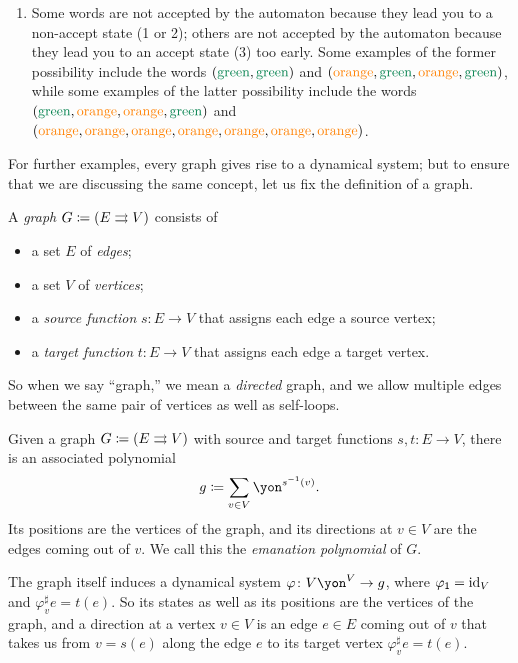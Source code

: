 \documentclass[Book-Poly]{subfiles}
\begin{document}
\begin{exercise}
\begin{solution}
\begin{enumerate}
    \item Some words are not accepted by the automaton because they lead you to a non-accept state (1 or 2); others are not accepted by the automaton because they lead you to an accept state (3) too early.
    Some examples of the former possibility include the words $({\color{dgreen}\text{green}},{\color{dgreen}\text{green}})$ and $({\color{orange}\text{orange}},{\color{dgreen}\text{green}},{\color{orange}\text{orange}},{\color{dgreen}\text{green}})$, while some examples of the latter possibility include the words $({\color{dgreen}\text{green}},{\color{orange}\text{orange}},{\color{orange}\text{orange}},{\color{dgreen}\text{green}})$ and $({\color{orange}\text{orange}},{\color{orange}\text{orange}},{\color{orange}\text{orange}},{\color{orange}\text{orange}},{\color{orange}\text{orange}},{\color{orange}\text{orange}},{\color{orange}\text{orange}})$.
\end{enumerate}
\end{solution}
\end{exercise}

For further examples, every graph gives rise to a dynamical system; but to ensure that we are discussing the same concept, let us fix the definition of a graph.

\begin{definition}[Graph] \label{def.graph}
A \emph{graph} $G \coloneqq (E \rightrightarrows V)$ consists of
\begin{itemize}
  \item a set $E$ of \emph{edges};
  \item a set $V$ of \emph{vertices};
  \item a \emph{source function} $s\colon E\to V$ that assigns each edge a source vertex;
  \item a \emph{target function} $t\colon E\to V$ that assigns each edge a target vertex.
\end{itemize}
\end{definition}

So when we say ``graph,'' we mean a \emph{directed} graph, and we allow multiple edges between the same pair of vertices as well as self-loops.

\begin{example} \label{ex.graph_dyn}
Given a graph $G\coloneqq(E\rightrightarrows V)$ with source and target functions $s,t\colon E\to V$, there is an associated polynomial
\[
    g\coloneqq\sum_{v \in V} \yon^{s\inv(v)}.
\]
Its positions are the vertices of the graph, and its directions at $v\in V$ are the edges coming out of $v$.
We call this the \emph{emanation polynomial} of $G$.

The graph itself induces a dynamical system $\varphi\colon V\yon^V\to g$, where $\varphi_{\textsf{1}} = \mathrm{id}_V$ and $\varphi^\sharp_v e = t(e)$.
So its states as well as its positions are the vertices of the graph, and a direction at a vertex $v\in V$ is an edge $e\in E$ coming out of $v$ that takes us from $v=s(e)$ along the edge $e$ to its target vertex $\varphi^\sharp_v e=t(e)$.
\end{example}
\end{document}
